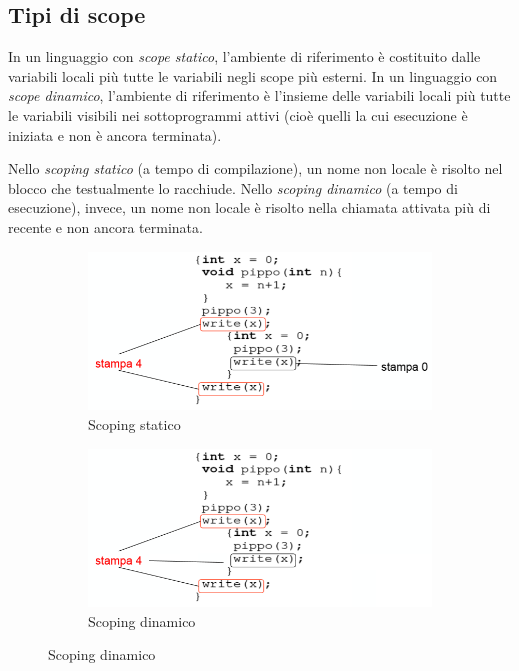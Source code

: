 \documentclass[a4paper,oneside,titlepage]{book}
\begin{document}
\subsection{Tipi di scope}
In un linguaggio con \textit{scope statico}, l'ambiente di riferimento è costituito dalle variabili locali più tutte le variabili negli scope più esterni. In un linguaggio con \textit{scope dinamico}, l'ambiente di riferimento è l'insieme delle variabili locali più tutte le variabili visibili nei sottoprogrammi attivi (cioè quelli la cui esecuzione è iniziata e non è ancora terminata).

Nello \textit{scoping statico} (a tempo di compilazione), un nome non locale è risolto nel blocco che testualmente lo racchiude. Nello \textit{scoping dinamico} (a tempo di esecuzione), invece, un nome non locale è risolto nella chiamata attivata più di recente e non ancora terminata.
\begin{figure}[htp]
	\begin{subfigure}{0.49\textwidth}
		\includegraphics[width=\textwidth, height=\textheight, keepaspectratio]{scopeStatico.png} 
		\caption{Scoping statico}
	\end{subfigure}
	\hfill
	\begin{subfigure}{0.49\textwidth}
		\includegraphics[width=\textwidth, height=\textheight, keepaspectratio]{scopeDinamico.png}
		\caption{Scoping dinamico}
	\end{subfigure}
\end{figure}
\end{document}
